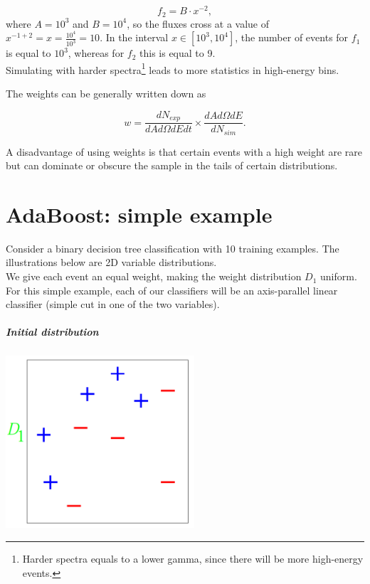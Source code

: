 \begin{appendices}
\begin{itemize}
\begin{equation}
f_2 = B \cdot x^{-2},
\end{equation}
\noindent where $A = 10^3$ and $B = 10^4$, so the fluxes cross at a value of $x^{-1+2} = x = \frac{10^4}{10^3} = 10$. In the interval $x \in [10^3,10^4]$, the number of events for $f_1$ is equal to $10^3$, whereas for $f_2$ this is equal to 9.\\

\noindent Simulating with harder spectra\footnote{Harder spectra equals to a lower gamma, since there will be more high-energy events.} leads to more statistics in high-energy bins.
\end{itemize}
\vspace{3mm}
\noindent The weights can be generally written down as

\begin{equation}
w = \frac{dN_{exp}}{dA d\Omega dE dt} \times \frac{dA d\Omega dE}{dN_{sim}}.
\end{equation}

\vspace{3mm}
\noindent A disadvantage of using weights is that certain events with a high weight are rare but can dominate or obscure the sample in the tails of certain distributions.

\chapter{AdaBoost: simple example}
\label{ch:adaboostappendix}

Consider a binary decision tree classification with 10 training examples. The illustrations below are 2D variable distributions.\\
\newline
\noindent We give each event an equal weight, making the weight distribution $D_1$ uniform. For this simple example, each of our classifiers will be an axis-parallel linear classifier (simple cut in one of the two variables).

\paragraph{Initial distribution}


\begin{center}
\includegraphics[width=7cm]{appendix/img/adaboost1.png}
\end{center}


\end{appendices}
